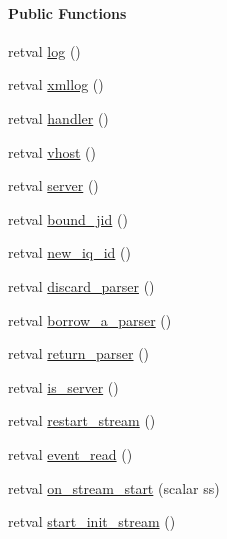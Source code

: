 \begin{Indent}\paragraph*{\-Public \-Functions}
\begin{DoxyCompactItemize}
\item 
retval \hyperlink{class_d_jabberd_1_1_connection_a6b3f674a6dea6a030b0a929799c016f9}{log} ()
\item 
retval \hyperlink{class_d_jabberd_1_1_connection_ab1e34b9467c8e056ca21888b35fbdd51}{xmllog} ()
\item 
retval \hyperlink{class_d_jabberd_1_1_connection_aa4a669c10ab58454685db37d6b63ca69}{handler} ()
\item 
retval \hyperlink{class_d_jabberd_1_1_connection_ace31eac7e5fa7b0985da3724df78220e}{vhost} ()
\item 
retval \hyperlink{class_d_jabberd_1_1_connection_a924e52e7e94a2e321fd4bf4063319707}{server} ()
\item 
retval \hyperlink{class_d_jabberd_1_1_connection_a93618f2ca51965d88c57e79648b73b01}{bound\-\_\-jid} ()
\item 
retval \hyperlink{class_d_jabberd_1_1_connection_a7a3d54aed42b99e99cfe42984f7c74d1}{new\-\_\-iq\-\_\-id} ()
\item 
retval \hyperlink{class_d_jabberd_1_1_connection_aaeb487aae8ffeab6d9daadc2e2dd14f2}{discard\-\_\-parser} ()
\item 
retval \hyperlink{class_d_jabberd_1_1_connection_a217036b47401e05e6df62990faf7fa11}{borrow\-\_\-a\-\_\-parser} ()
\item 
retval \hyperlink{class_d_jabberd_1_1_connection_a052f1e95d068010f537b15f7f43d57aa}{return\-\_\-parser} ()
\item 
retval \hyperlink{class_d_jabberd_1_1_connection_aa7d0aa5420e8596a8a68589a4d5160cd}{is\-\_\-server} ()
\item 
retval \hyperlink{class_d_jabberd_1_1_connection_a0658ff79c96ce74eb311963cf21be7f9}{restart\-\_\-stream} ()
\item 
retval \hyperlink{class_d_jabberd_1_1_connection_a3468c60c43a823234a38b879ccedb991}{event\-\_\-read} ()
\item 
retval \hyperlink{class_d_jabberd_1_1_connection_a9a53b1e335fa929e6c505c1364e06723}{on\-\_\-stream\-\_\-start} (scalar ss)
\item 
retval \hyperlink{class_d_jabberd_1_1_connection_a9da43b0a6f7b7f011796c311b4b60c7c}{start\-\_\-init\-\_\-stream} ()
\item 

\end{DoxyCompactItemize}
\end{Indent}
